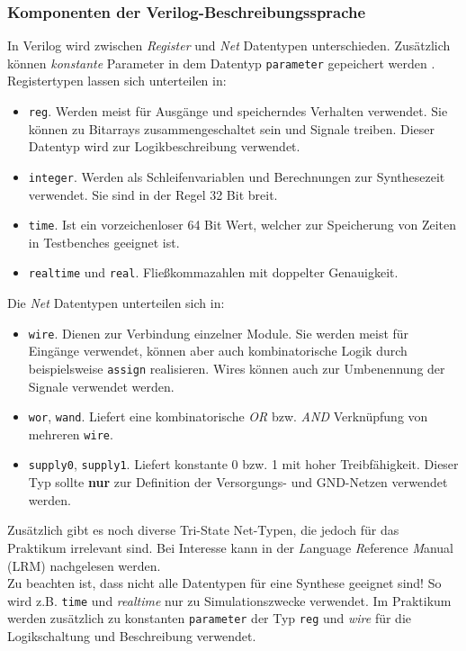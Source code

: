 \subsubsection{Komponenten der Verilog-Beschreibungssprache}
In Verilog wird zwischen \emph{Register} und \emph{Net} Datentypen unterschieden. Zusätzlich können \emph{konstante} Parameter in dem Datentyp \texttt{parameter} gepeichert werden \cite{IEEE_Verilog2001}. \\
Registertypen lassen sich unterteilen in:
\begin{itemize}
	\item \texttt{reg}. Werden meist für Ausgänge und speicherndes Verhalten verwendet. Sie können zu Bitarrays zusammengeschaltet sein und Signale treiben. Dieser Datentyp wird zur Logikbeschreibung verwendet.
	\item \texttt{integer}. Werden als Schleifenvariablen und Berechnungen zur Synthesezeit verwendet. Sie sind in der Regel 32 Bit breit.
	\item \texttt{time}. Ist ein vorzeichenloser 64 Bit Wert, welcher zur Speicherung von Zeiten in Testbenches geeignet ist.
	\item \texttt{realtime} und \texttt{real}. Fließkommazahlen mit doppelter Genauigkeit.
\end{itemize}
Die \emph{Net} Datentypen unterteilen sich in:
\begin{itemize}
	\item \texttt{wire}. Dienen zur Verbindung einzelner Module. Sie werden meist für Eingänge verwendet, können aber auch kombinatorische Logik durch beispielsweise \texttt{assign} realisieren. Wires können auch zur Umbenennung der Signale verwendet werden.
	\item \texttt{wor}, \texttt{wand}. Liefert eine kombinatorische \emph{OR} bzw. \emph{AND} Verknüpfung von mehreren \texttt{wire}.
	\item \texttt{supply0}, \texttt{supply1}. Liefert konstante 0 bzw. 1 mit hoher Treibfähigkeit. Dieser Typ sollte \textbf{nur} zur Definition der Versorgungs- und GND-Netzen verwendet werden.
\end{itemize}
Zusätzlich gibt es noch diverse Tri-State Net-Typen, die jedoch für das Praktikum irrelevant sind. Bei Interesse kann in der \emph{L}anguage \emph{R}eference \emph{M}anual (LRM) \cite{IEEE_Verilog2001} nachgelesen werden.\\
Zu beachten ist, dass nicht alle Datentypen für eine Synthese geeignet sind! So wird z.B. \texttt{time} und \emph{realtime} nur zu Simulationszwecke verwendet. Im Praktikum werden zusätzlich zu konstanten \texttt{parameter} der Typ \texttt{reg} und \emph{wire} für die Logikschaltung und Beschreibung verwendet.
